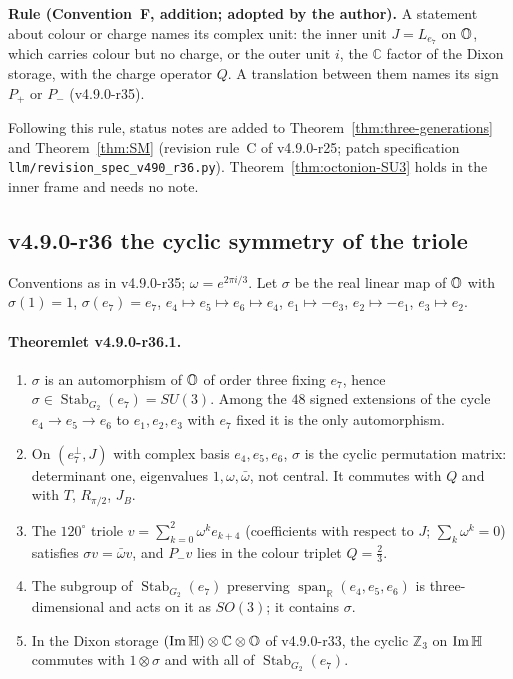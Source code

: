 \noindent\textbf{Rule (Convention~F, addition; adopted by the author).}
A statement about colour or charge names its complex unit: the inner unit \(J=L_{e_7}\) on \(\mathbb{O}\), which carries colour but no
charge, or the outer unit \(i\), the \(\mathbb C\) factor of the Dixon storage, with the charge operator \(Q\).  A translation
between them names its sign \(P_+\) or \(P_-\) (v4.9.0-r35).

Following this rule, status notes are added to Theorem~\ref{thm:three-generations} and Theorem~\ref{thm:SM} (revision rule~C of
v4.9.0-r25; patch specification \texttt{llm/revision\_spec\_v490\_r36.py}).  Theorem~\ref{thm:octonion-SU3} holds in the inner
frame and needs no note.

\subsection*{v4.9.0-r36 the cyclic symmetry of the triole}
\label{subsec:v490-r36-results}

Conventions as in v4.9.0-r35; \(\omega=e^{2\pi i/3}\).  Let \(\sigma\) be the real linear map of \(\mathbb{O}\) with \(\sigma(1)=1\),
\(\sigma(e_7)=e_7\), \(e_4\mapsto e_5\mapsto e_6\mapsto e_4\), \(e_1\mapsto-e_3\), \(e_2\mapsto-e_1\), \(e_3\mapsto e_2\).

\paragraph{Theoremlet v4.9.0-r36.1.}
\begin{enumerate}[leftmargin=2em]
\item[(a)] \(\sigma\) is an automorphism of \(\mathbb{O}\) of order three fixing \(e_7\), hence \(\sigma\in\operatorname{Stab}_{G_2}(e_7)=SU(3)\).
Among the \(48\) signed extensions of the cycle \(e_4\to e_5\to e_6\) to \(e_1,e_2,e_3\) with \(e_7\) fixed it is the only
automorphism.
\item[(b)] On \((e_7^\perp,J)\) with complex basis \(e_4,e_5,e_6\), \(\sigma\) is the cyclic permutation matrix: determinant one,
eigenvalues \(1,\omega,\bar\omega\), not central.  It commutes with \(Q\) and with \(T\), \(R_{\pi/2}\), \(J_B\).
\item[(c)] The \(120^\circ\) triole \(v=\sum_{k=0}^{2}\omega^k e_{k+4}\) (coefficients with respect to \(J\); \(\sum_k\omega^k=0\))
satisfies \(\sigma v=\bar\omega v\), and \(P_-v\) lies in the colour triplet \(Q=\tfrac23\).
\item[(d)] The subgroup of \(\operatorname{Stab}_{G_2}(e_7)\) preserving \(\operatorname{span}_{\mathbb R}(e_4,e_5,e_6)\) is
three-dimensional and acts on it as \(SO(3)\); it contains \(\sigma\).
\item[(e)] In the Dixon storage \((\operatorname{Im}\mathbb{H})\otimes\mathbb C\otimes\mathbb{O}\) of v4.9.0-r33, the cyclic \(\mathbb Z_3\) on
\(\operatorname{Im}\mathbb{H}\) commutes with \(1\otimes\sigma\) and with all of \(\operatorname{Stab}_{G_2}(e_7)\).
\end{enumerate}

